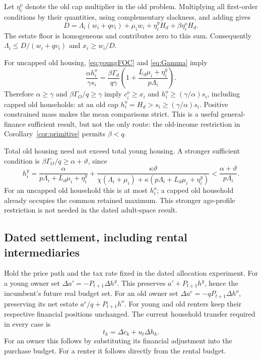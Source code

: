 \documentclass[11pt]{article}
\newcommand{\tht}{\vartheta}
\begin{document}
Let $\eta_i^o$ denote the old cap multiplier in the old problem. Multiplying all first-order conditions by their quantities, using complementary slackness, and adding gives
\begin{equation}
 D=\Lambda_i(w_i+qv_i)+\mu_iw_i+\eta_i^yH_d+\beta\eta_i^oH_d.\label{eq:scaling}
\end{equation}
The estate floor is homogeneous and contributes zero to this sum. Consequently
$\Lambda_i\le D/(w_i+qv_i)$ and $x_i\ge w_i/D$.

For uncapped old housing, \eqref{eq:youngFOC} and \eqref{eq:Gamma} imply
\begin{equation}
 \frac{\alpha h_i^o}{\gamma s_i}
 =\frac{\beta\Gamma_d}{q\gamma}
 \left(1+\frac{L_d\mu_i+\eta_i^y}{p\Lambda_i}\right).\label{eq:ageadult}
\end{equation}
Therefore $\alpha\ge\gamma$ and $\beta\Gamma_O/q\ge\gamma$ imply
$c_i^o\ge x_i$ and $h_i^o\ge(\gamma/\alpha)s_i$, including capped old households: at an old cap $h_i^o=H_d>s_i\ge(\gamma/\alpha)s_i$. Positive constrained mass makes the mean comparisons strict. This is a useful general-finance sufficient result, but not the only route: the old-income restriction in Corollary~\ref{cor:primitive} permits $\beta<q$.

Total old housing need not exceed total young housing. A stronger sufficient condition is $\beta\Gamma_O/q\ge\alpha+\tht$, since
\[
 h_i^y=\frac{\alpha}{p\Lambda_i+L_d\mu_i+\eta_i^y}
 +\frac{\kappa\tht}{\chi(\Lambda_i+\mu_i)+\kappa(p\Lambda_i+L_d\mu_i+\eta_i^y)}
 <\frac{\alpha+\tht}{p\Lambda_i}.
\]
For an uncapped old household this is at most $h_i^o$; a capped old household already occupies the common retained maximum. This stronger age-profile restriction is not needed in the dated adult-space result.

\subsection{Dated settlement, including rental intermediaries}
Hold the price path and the tax rate fixed in the dated allocation experiment. For a young owner set
$\Delta a'=-P_{t+1}\Delta h^y$. This preserves $a'+P_{t+1}h^y$, hence the incumbent's future real budget set. For an old owner set
$\Delta a^e=-qP_{t+1}\Delta h^o$, preserving its net estate $a^e/q+P_{t+1}h^o$. For young and old renters keep their respective financial positions unchanged. The current household transfer required in every case is
\begin{equation}
 t_k=\Delta c_k+u_t\Delta h_k.\label{eq:settlement}
\end{equation}
For an owner this follows by substituting its financial adjustment into the purchase budget. For a renter it follows directly from the rental budget.
\end{document}
